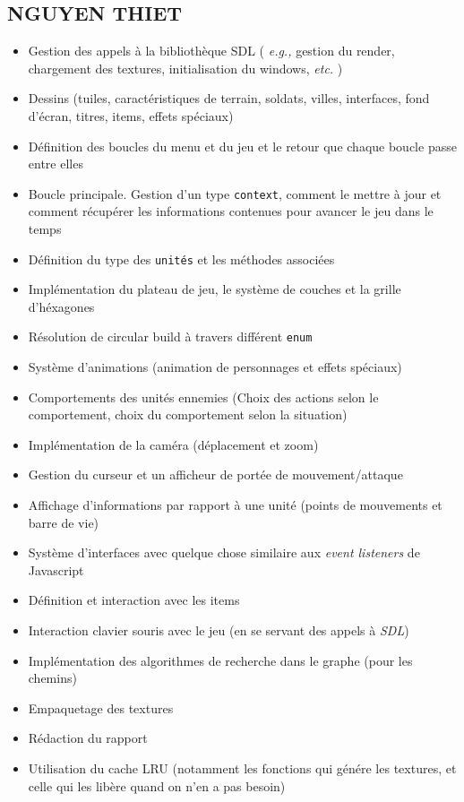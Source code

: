 \documentclass{article}
\begin{document}
\subsection{NGUYEN THIET}
\begin{itemize}
    \item Gestion des appels à la bibliothèque SDL ( \textit{e.g.,} gestion du render, chargement des textures, initialisation
    du windows, \textit{etc.} )
    \item Dessins (tuiles, caractéristiques de terrain, soldats, villes, interfaces, fond d'écran, titres, items, effets spéciaux)
    \item Définition des boucles du menu et du jeu et le retour que chaque boucle passe entre elles
    \item Boucle principale. Gestion d'un type \texttt{context}, comment le mettre à jour et comment récupérer les informations contenues pour avancer le jeu dans le temps
    \item Définition du type des \texttt{unités} et les méthodes associées
    \item Implémentation du plateau de jeu, le système de couches et la grille d'héxagones 
    \item Résolution de circular build à travers différent \texttt{enum}
    \item Système d'animations (animation de personnages et effets spéciaux)
    \item Comportements des unités ennemies (Choix des actions selon le comportement, choix du comportement selon la situation)
    \item Implémentation de la caméra (déplacement et zoom)
    \item Gestion du curseur et un afficheur de portée de mouvement/attaque
    \item Affichage d'informations par rapport à une unité (points de mouvements et barre de vie)
    \item Système d'interfaces avec quelque chose similaire aux \textit{event listeners} de Javascript
    \item Définition et interaction avec les items
    \item Interaction clavier souris avec le jeu (en se servant des appels à \textit{SDL})
    \item Implémentation des algorithmes de recherche dans le graphe (pour les chemins)
    \item Empaquetage des textures
    \item Rédaction du rapport
    \item Utilisation du cache LRU (notamment les fonctions qui génére les textures, et celle qui les libère quand on n'en a pas besoin)
\end{itemize}
\end{document}
